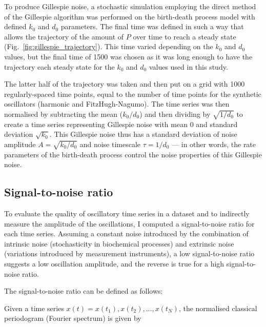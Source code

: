 To produce Gillespie noise, a stochastic simulation employing the direct method of the Gillespie algorithm was performed on the birth-death process model with defined $k_{0}$ and $d_{0}$ parameters.
The final time was defined in such a way that allows the trajectory of the amount of $P$ over time to reach a steady state (Fig.\ \ref{fig:gillespie_trajectory}).
This time varied depending on the $k_{0}$ and $d_{0}$ values, but the final time of \num{1500} was chosen as it was long enough to have the trajectory each steady state for the $k_{0}$ and $d_{0}$ values used in this study.

The latter half of the trajectory was taken and then put on a grid with \num{1000} regularly-spaced time points, equal to the number of time points for the synthetic oscillators (harmonic and FitzHugh-Nagumo).
The time series was then normalised by subtracting the mean ($k_{0}/d_{0}$) and then dividing by $\sqrt{1/d_{0}}$ to create a time series representing Gillespie noise with mean 0 and standard deviation $\sqrt{k_{0}}$.
This Gillespie noise thus has a standard deviation of noise amplitude $A = \sqrt{k_{0}/d_{0}}$ and noise timescale $\tau = 1/d_{0}$ --- in other words, the rate parameters of the birth-death process control the noise properties of this Gillespie noise.


\subsection{Signal-to-noise ratio}
\label{subsec:methods-computational-snr}

To evaluate the quality of oscillatory time series in a dataset and to indirectly measure the amplitude of the oscillations, I computed a signal-to-noise ratio for each time series.
Assuming a constant noise introduced by the combination of intrinsic noise (stochasticity in biochemical processes) and extrinsic noise (variations introduced by measurement instruments), a low signal-to-noise ratio suggests a low oscillation amplitude, and the reverse is true for a high signal-to-noise ratio.

The signal-to-noise ratio can be defined as follows:

Given a time series $x(t) = x(t_{1}), x(t_{2}), \ldots, x(t_{N})$, the normalised classical periodogram (Fourier spectrum) is given by

